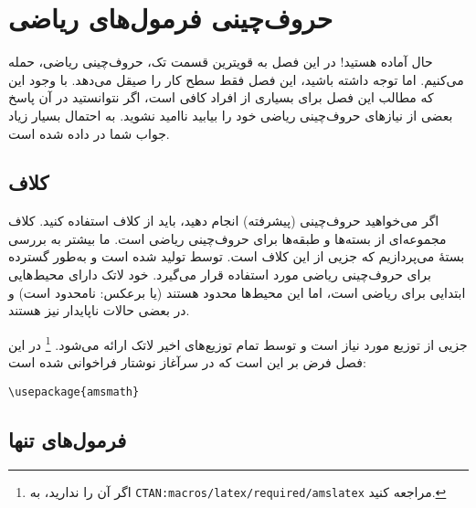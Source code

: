 \chapter{حروف‌چینی فرمول‌های ریاضی}
\makeatletter
\def\tagform@#1{\maketag@@@{\lr{(\ignorespaces\@@text{#1}\unskip\@@italiccorr)}}}
\makeatother
\begin{intro}

حال آماده هستید! در این فصل به قویترین قسمت تک، حروف‌چینی ریاضی، حمله می‌کنیم. اما توجه داشته باشید، این فصل فقط سطح کار را صیقل می‌دهد. با ‌وجود این که مطالب این فصل برای بسیاری از افراد کافی است، اگر نتوانستید در آن پاسخ بعضی از نیازهای حروف‌چینی ریاضی خود را بیابید نا‌امید نشوید. به احتمال بسیار زیاد جواب شما در  \lr{\AmS-\LaTeX{}} داده شده است.
\end{intro}
\section{\texorpdfstring{کلاف }{کلاف AMS-Latex}}
اگر می‌خواهید حروف‌چینی (پیشرفته)
انجام دهید، باید از کلاف 
\lr{\AmS-\LaTeX} 
استفاده کنید. کلاف 
\lr{\AmS-\LaTeX} 
مجموعه‌ای از بسته‌ها و طبقه‌ها برای حروف‌چینی ریاضی است. ما بیشتر به بررسی بستۀ 
می‌پردازیم که جزیی از این کلاف است. 
\lr{\AmS-\LaTeX} 
توسط  تولید شده است و به‌طور گسترده برای حروف‌چینی ریاضی مورد استفاده قرار می‌گیرد. خود لاتک دارای محیط‌هایی ابتدایی برای ریاضی است، اما این محیط‌ها محدود هستند 
(یا برعکس: \lr{\AmS-\LaTeX} نامحدود است)
و در بعضی حالات ناپایدار نیز هستند.

\lr{\AmS-\LaTeX} 
جزیی از توزیع مورد نیاز است و توسط تمام توزیع‌های اخیر لاتک ارائه می‌شود.%
\footnote{اگر آن را ندارید، به 
  \texttt{CTAN:macros/latex/required/amslatex} مراجعه کنید.} 
در این فصل فرض بر این است که  در سرآغاز نوشتار‌ فراخوانی شده است:

\begin{code}
\verb|\usepackage{amsmath}|
\end{code}
\section{فرمول‌های تنها}

